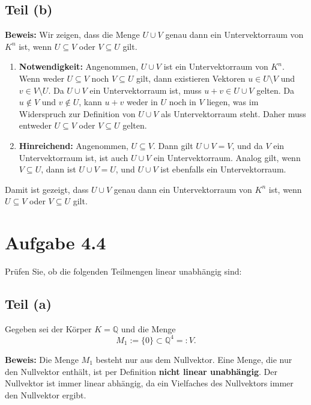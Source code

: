 \documentclass[11pt]{article}
\begin{document}
\subsection*{Teil (b)}

\textbf{Beweis:} Wir zeigen, dass die Menge \( U \cup V \) genau dann ein Untervektorraum von \( K^n \) ist, wenn \( U \subseteq V \) oder \( V \subseteq U \) gilt.

\begin{enumerate}
    \item \textbf{Notwendigkeit:} Angenommen, \( U \cup V \) ist ein Untervektorraum von \( K^n \). Wenn weder \( U \subseteq V \) noch \( V \subseteq U \) gilt, dann existieren Vektoren \( u \in U \setminus V \) und \( v \in V \setminus U \). Da \( U \cup V \) ein Untervektorraum ist, muss \( u + v \in U \cup V \) gelten. Da \( u \notin V \) und \( v \notin U \), kann \( u + v \) weder in \( U \) noch in \( V \) liegen, was im Widerspruch zur Definition von \( U \cup V \) als Untervektorraum steht. Daher muss entweder \( U \subseteq V \) oder \( V \subseteq U \) gelten.

    \item \textbf{Hinreichend:} Angenommen, \( U \subseteq V \). Dann gilt \( U \cup V = V \), und da \( V \) ein Untervektorraum ist, ist auch \( U \cup V \) ein Untervektorraum. Analog gilt, wenn \( V \subseteq U \), dann ist \( U \cup V = U \), und \( U \cup V \) ist ebenfalls ein Untervektorraum.
\end{enumerate}

Damit ist gezeigt, dass \( U \cup V \) genau dann ein Untervektorraum von \( K^n \) ist, wenn \( U \subseteq V \) oder \( V \subseteq U \) gilt.


\section*{Aufgabe 4.4}

Prüfen Sie, ob die folgenden Teilmengen linear unabhängig sind:

\subsection*{Teil (a)}

Gegeben sei der Körper \( K = \mathbb{Q} \) und die Menge
\[
M_1 := \{ 0 \} \subset \mathbb{Q}^4 =: V.
\]

\textbf{Beweis:} Die Menge \( M_1 \) besteht nur aus dem Nullvektor. Eine Menge, die nur den Nullvektor enthält, ist per Definition \textbf{nicht linear unabhängig}. Der Nullvektor ist immer linear abhängig, da ein Vielfaches des Nullvektors immer den Nullvektor ergibt.
\end{document}
